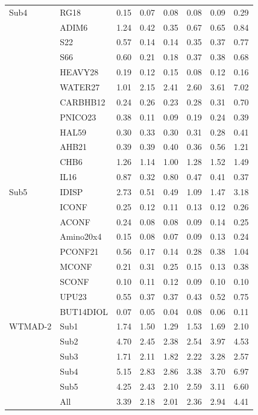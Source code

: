 \begin{ThreePartTable}
\begin{longtable}{lld{2.2}d{2.2}d{2.2}d{2.2}d{2.2}d{2.2}}
  Sub4    & RG18      & 0.15  & 0.07  & 0.08  & 0.08   & 0.09  & 0.29  \\
          & ADIM6     & 1.24  & 0.42  & 0.35  & 0.67   & 0.65  & 0.84  \\
          & S22       & 0.57  & 0.14  & 0.14  & 0.35   & 0.37  & 0.77  \\
          & S66       & 0.60  & 0.21  & 0.18  & 0.37   & 0.38  & 0.68  \\
          & HEAVY28   & 0.19  & 0.12  & 0.15  & 0.08   & 0.12  & 0.16  \\
          & WATER27   & 1.01  & 2.15  & 2.41  & 2.60   & 3.61  & 7.02  \\
          & CARBHB12  & 0.24  & 0.26  & 0.23  & 0.28   & 0.31  & 0.70  \\
          & PNICO23   & 0.38  & 0.11  & 0.09  & 0.19   & 0.24  & 0.39  \\
          & HAL59     & 0.30  & 0.33  & 0.30  & 0.31   & 0.28  & 0.41  \\
          & AHB21     & 0.39  & 0.39  & 0.40  & 0.36   & 0.56  & 1.21  \\
          & CHB6      & 1.26  & 1.14  & 1.00  & 1.28   & 1.52  & 1.49  \\
          & IL16      & 0.87  & 0.32  & 0.80  & 0.47   & 0.41  & 0.37  \\ \hdashline
  Sub5    & IDISP     & 2.73  & 0.51  & 0.49  & 1.09   & 1.47  & 3.18  \\
          & ICONF     & 0.25  & 0.12  & 0.11  & 0.13   & 0.12  & 0.26  \\
          & ACONF     & 0.24  & 0.08  & 0.08  & 0.09   & 0.14  & 0.25  \\
          & Amino20x4 & 0.15  & 0.08  & 0.07  & 0.09   & 0.13  & 0.24  \\
          & PCONF21   & 0.56  & 0.17  & 0.14  & 0.28   & 0.38  & 1.04  \\
          & MCONF     & 0.21  & 0.31  & 0.25  & 0.15   & 0.13  & 0.38  \\
          & SCONF     & 0.10  & 0.11  & 0.12  & 0.09   & 0.10  & 0.10  \\
          & UPU23     & 0.55  & 0.37  & 0.37  & 0.43   & 0.52  & 0.75  \\
          & BUT14DIOL & 0.07  & 0.05  & 0.04  & 0.08   & 0.06  & 0.11  \\ \midrule
  WTMAD-2 & Sub1      & 1.74  & 1.50  & 1.29  & 1.53   & 1.69  & 2.10  \\
          & Sub2      & 4.70  & 2.45  & 2.38  & 2.54   & 3.97  & 4.53  \\
          & Sub3      & 1.71  & 2.11  & 1.82  & 2.22   & 3.28  & 2.57  \\
          & Sub4      & 5.15  & 2.83  & 2.86  & 3.38   & 3.70  & 6.97  \\
          & Sub5      & 4.25  & 2.43  & 2.10  & 2.59   & 3.11  & 6.60  \\
          & All       & 3.39  & 2.18  & 2.01  & 2.36   & 2.94  & 4.41  \\ \bottomrule
\end{longtable}
\end{ThreePartTable}

